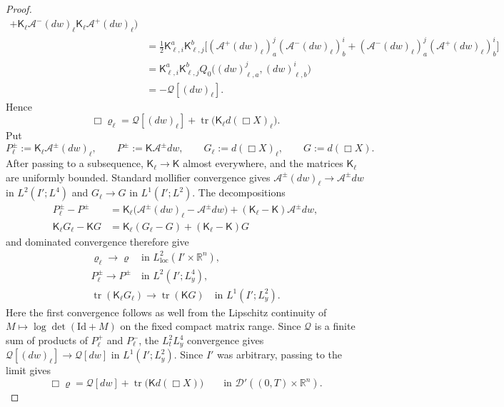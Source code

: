\documentclass[10pt,a4paper]{amsart}
\newcommand{\Kmat}{\mathsf K}
\newcommand{\Real}{\mathbb R}
\newcommand{\Rn}{\Real^n}
\DeclareMathOperator{\tr}{tr}
\begin{document}
\begin{proof}
\begin{align*}
      +\Kmat_\ell \mathcal A^-(dw)_\ell \Kmat_\ell \mathcal A^+(dw)_\ell
    \bigr)\\
 &=\frac12\Kmat_{\ell,i}^a\Kmat_{\ell,j}^b
   \Big[
      (\mathcal A^+(dw)_\ell)_a^j
      (\mathcal A^-(dw)_\ell)_b^i
     +(\mathcal A^-(dw)_\ell)_a^j
      (\mathcal A^+(dw)_\ell)_b^i
   \Big]\\
 &=\Kmat_{\ell,i}^a\Kmat_{\ell,j}^b
   Q_0\bigl((dw)_{\ell,a}^{ j},(dw)_{\ell,b}^{ i}\bigr)\\
 &=-\mathcal Q[(dw)_\ell].
\end{align*}
Hence
\begin{equation*}
    \Box\varrho_\ell
 =\mathcal Q[(dw)_\ell]
  +\tr\bigl(\Kmat_\ell d(\Box X)_\ell\bigr).
\end{equation*}
Put
\[
 P_\ell^\pm:=\Kmat_\ell\mathcal A^\pm(dw)_\ell,
 \qquad
 P^\pm:=\Kmat\mathcal A^\pm dw,
 \qquad
 G_\ell:=d(\Box X)_\ell,
 \qquad
 G:=d(\Box X).
\]
After passing to a subsequence, $\Kmat_\ell\to\Kmat$ almost everywhere,
and the matrices $\Kmat_\ell$ are uniformly bounded. Standard mollifier
convergence gives
$\mathcal A^\pm(dw)_\ell\to\mathcal A^\pm dw$ in
$L^2(I';L^4)$ and $G_\ell\to G$ in $L^1(I';L^2)$. The decompositions
\begin{align*}
 P_\ell^\pm-P^\pm
 &=\Kmat_\ell\bigl(\mathcal A^\pm(dw)_\ell
                    -\mathcal A^\pm dw\bigr)
   +(\Kmat_\ell-\Kmat)\mathcal A^\pm dw,\\
 \Kmat_\ell G_\ell-\Kmat G
 &=\Kmat_\ell(G_\ell-G)+(\Kmat_\ell-\Kmat)G
\end{align*}
and dominated convergence therefore give
\[
 \begin{gathered}
  \varrho_\ell\longrightarrow\varrho
  \quad\text{in }L^2_{\mathrm{loc}}(I'\times\Rn),\\
  P_\ell^\pm\longrightarrow P^\pm
  \quad\text{in }L^2(I';L^4_y),\\
  \tr(\Kmat_\ell G_\ell)\longrightarrow\tr(\Kmat G)
  \quad\text{in }L^1(I';L^2_y).
 \end{gathered}
\]
Here the first convergence follows as well from the Lipschitz continuity of
$M\mapsto\log\det(\mathrm{Id}+M)$ on the fixed compact matrix range. Since
$\mathcal Q$ is a finite sum of products of $P_\ell^+$ and $P_\ell^-$,
the $L^2_tL^4_y$ convergence gives
$\mathcal Q[(dw)_\ell]\to\mathcal Q[dw]$ in $L^1(I';L^2_y)$. Since $I'$ was
arbitrary, passing to the limit gives
\begin{equation}\label{eq:weak-jacobi}
 \Box\varrho
 =\mathcal Q[dw]+\tr\bigl(\Kmat d(\Box X)\bigr)
 \qquad\text{in }\mathcal D'((0,T)\times\Rn).
\end{equation}


\end{proof}
\end{document}
